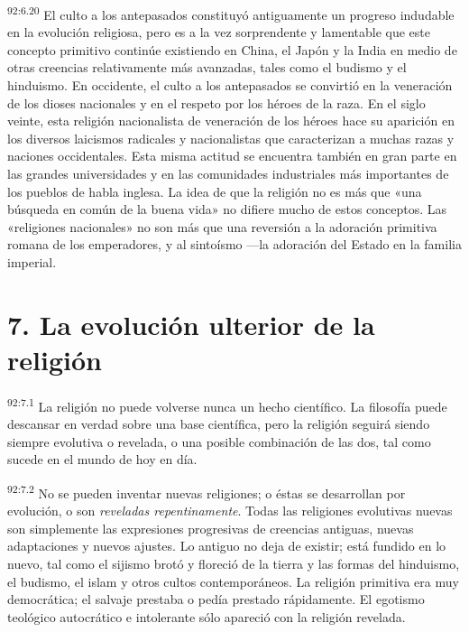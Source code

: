 \par
\textsuperscript{92:6.20} El culto a los antepasados constituyó antiguamente un progreso indudable en la evolución religiosa, pero es a la vez sorprendente y lamentable que este concepto primitivo continúe existiendo en China, el Japón y la India en medio de otras creencias relativamente más avanzadas, tales como el budismo y el hinduismo. En occidente, el culto a los antepasados se convirtió en la veneración de los dioses nacionales y en el respeto por los héroes de la raza. En el siglo veinte, esta religión nacionalista de veneración de los héroes hace su aparición en los diversos laicismos radicales y nacionalistas que caracterizan a muchas razas y naciones occidentales. Esta misma actitud se encuentra también en gran parte en las grandes universidades y en las comunidades industriales más importantes de los pueblos de habla inglesa. La idea de que la religión no es más que «una búsqueda en común de la buena vida» no difiere mucho de estos conceptos. Las «religiones nacionales» no son más que una reversión a la adoración primitiva romana de los emperadores, y al sintoísmo ---la adoración del Estado en la familia imperial.

\section*{7. La evolución ulterior de la religión}
\par
\textsuperscript{92:7.1} La religión no puede volverse nunca un hecho científico. La filosofía puede descansar en verdad sobre una base científica, pero la religión seguirá siendo siempre evolutiva o revelada, o una posible combinación de las dos, tal como sucede en el mundo de hoy en día.

\par
\textsuperscript{92:7.2} No se pueden inventar nuevas religiones; o éstas se desarrollan por evolución, o son \textit{reveladas repentinamente}. Todas las religiones evolutivas nuevas son simplemente las expresiones progresivas de creencias antiguas, nuevas adaptaciones y nuevos ajustes. Lo antiguo no deja de existir; está fundido en lo nuevo, tal como el sijismo brotó y floreció de la tierra y las formas del hinduismo, el budismo, el islam y otros cultos contemporáneos. La religión primitiva era muy democrática; el salvaje prestaba o pedía prestado rápidamente. El egotismo teológico autocrático e intolerante sólo apareció con la religión revelada.

